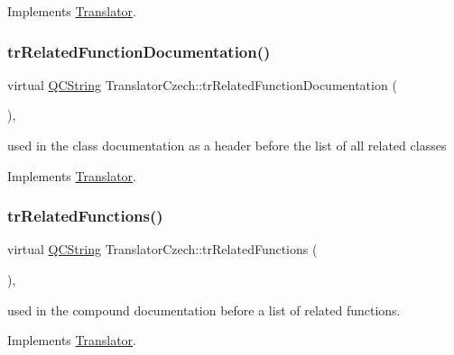Implements \mbox{\hyperlink{class_translator}{Translator}}.

\mbox{\label{class_translator_czech_a652d74ab5a73e013a1ccc53a07f4f17a}} 
\subsubsection{\texorpdfstring{trRelatedFunctionDocumentation()}{trRelatedFunctionDocumentation()}}
{\footnotesize\ttfamily virtual \mbox{\hyperlink{class_q_c_string}{Q\+C\+String}} Translator\+Czech\+::tr\+Related\+Function\+Documentation (\begin{DoxyParamCaption}{ }\end{DoxyParamCaption})\hspace{0.3cm}{\ttfamily [inline]}, {\ttfamily [virtual]}}

used in the class documentation as a header before the list of all related classes 

Implements \mbox{\hyperlink{class_translator}{Translator}}.

\mbox{\label{class_translator_czech_a6185da8c8ea1b0cbc444a947432dc1d8}} 
\subsubsection{\texorpdfstring{trRelatedFunctions()}{trRelatedFunctions()}}
{\footnotesize\ttfamily virtual \mbox{\hyperlink{class_q_c_string}{Q\+C\+String}} Translator\+Czech\+::tr\+Related\+Functions (\begin{DoxyParamCaption}{ }\end{DoxyParamCaption})\hspace{0.3cm}{\ttfamily [inline]}, {\ttfamily [virtual]}}

used in the compound documentation before a list of related functions. 

Implements \mbox{\hyperlink{class_translator}{Translator}}.

\mbox{\label{class_translator_czech_a00266e0f5943c8743ab6a1fd3cf290ce}} 
